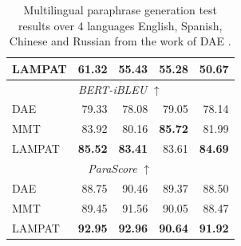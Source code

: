 \documentclass[letterpaper]{article} %
\begin{document}
\begin{table}[h!]
\begin{tabular}{|l|rrrr|}
LAMPAT                   & \textbf{61.32}                  & \textbf{55.43}                  & \textbf{55.28}                  & \textbf{50.67}                  \\ \hline
\multicolumn{5}{|c|}{\textit{BERT-iBLEU} $\uparrow$}                                                                                                                                                     \\ \hline
DAE                           & 79.33                           & 78.08                           & 79.05                           & 78.14                            \\
MMT                         & 83.92                           & 80.16                           & \textbf{85.72}                           & 81.99                            \\
LAMPAT                   & \textbf{85.52}                  & \textbf{83.41}                  & 83.61                  & \textbf{84.69}                   \\ \hline
\multicolumn{5}{|c|}{\textit{ParaScore} $\uparrow$}                                                                                                                                 \\ \hline
DAE                           & 88.75                           & 90.46                           & 89.37                           & 88.50                           \\
MMT                         & 89.45                           & 91.56                           & 90.05                           & 88.47                           \\
LAMPAT                   & \textbf{92.95}                  & \textbf{92.96}                  & \textbf{90.64}                  & \textbf{91.92}    \\\hline
\end{tabular}
\caption{Multilingual paraphrase generation test results over 4 languages English, Spanish, Chinese and Russian from the work of DAE \citep{guo2019zeroshot}.}
\label{tab:main_result}
\end{table}
\end{document}
